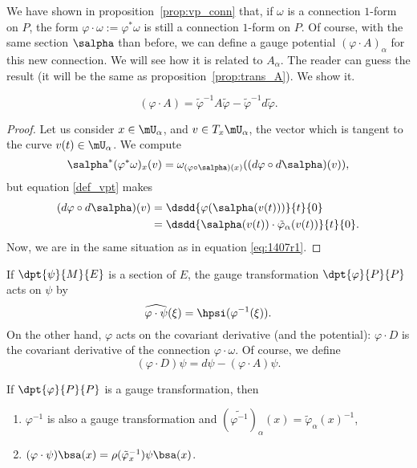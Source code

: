 We have shown in proposition~\ref{prop:vp_conn} that, if $\omega$ is a connection $1$-form on $P$, the form $\varphi\cdot\omega:=\varphi^*\omega$ is still a connection $1$-form on $P$. Of course, with the same section $\salpha$ than before, we can define a gauge potential $(\varphi\cdot A)_{\alpha}$ for this new connection. We will see how it is related to $A_{\alpha}$. The reader can guess the result (it will be the same as proposition~\ref{prop:trans_A}). We show it.

\begin{proposition}		\label{Proptr_de_A}
	\begin{equation}\label{tr_de_A}
		(\varphi\cdot A)=\tilde{\varphi}^{-1} A\tilde{\varphi}-\tilde{\varphi}^{-1} d\tilde{\varphi}.
	\end{equation}
\end{proposition}
\begin{proof}
	Let us consider $x\in\mU_{\alpha}$, and $v\in T_x\mU_{\alpha}$, the vector which is tangent to the curve $v(t)\in\mU_{\alpha}$. We compute
	\[
		\salpha^*(\varphi^*\omega)_x(v)=\omega_{(\varphi\circ\salpha)(x)}((d\varphi\circ d\salpha)(v)),
	\]
	but equation \eqref{def_vpt} makes
	\begin{equation}
		\begin{split}
			(d\varphi\circ d\salpha)(v)&=\dsdd{\varphi(\salpha(v(t)))}{t}{0}\\
			&=\dsdd{\salpha(v(t))\cdot\tilde{\varphi}_{\alpha}(v(t))}{t}{0}.
		\end{split}
	\end{equation}
	Now, we are in the same situation as in equation \eqref{eq:1407r1}.
\end{proof}

If $\dpt{\psi}{M}{E}$ is a section of $E$, the gauge transformation $\dpt{\varphi}{P}{P}$ acts on $\psi$ by
\begin{equation}
	\widehat{\varphi\cdot\psi}(\xi)=\hpsi(\varphi^{-1}(\xi)).
\end{equation}
On the other hand, $\varphi$ acts on the covariant derivative (and the potential):
$\varphi\cdot D$ is the covariant derivative  of the connection $\varphi\cdot\omega$. Of course, we define
\begin{equation}
	(\varphi\cdot D)\psi=d\psi-(\varphi\cdot A)\psi.
\end{equation}

\begin{lemma}
	If $\dpt{\varphi}{P}{P}$ is a gauge transformation, then
	\begin{enumerate}
		\item $\varphi^{-1}$ is also a gauge transformation and
		      $(\widetilde{\varphi^{-1}})_{\alpha}(x)=\tilde{\varphi}_{\alpha}(x)^{-1}$, \label{lem:i}
		\item $(\varphi\cdot\psi)\bsa(x)=\rho(\tilde{\varphi}_x^{-1})\psi\bsa(x)$.\label{lem:ii}
	\end{enumerate}
	\label{lem:prop_gauge}
\end{lemma}

